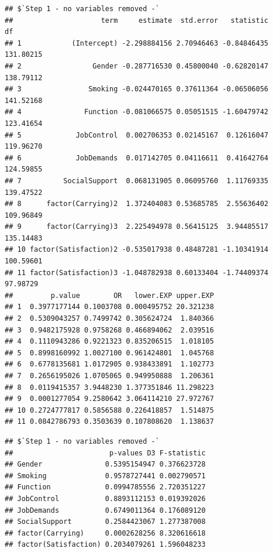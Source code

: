 \documentclass[
]{book}
\newenvironment{Shaded}{\begin{snugshade}}{\end{snugshade}}
\newcommand{\NormalTok}[1]{#1}
\newcommand{\OperatorTok}[1]{\textcolor[rgb]{0.81,0.36,0.00}{\textbf{#1}}}
\begin{document}
\begin{Shaded}
\end{Shaded}

\begin{verbatim}
## $`Step 1 - no variables removed -`
##                     term     estimate  std.error   statistic        df
## 1            (Intercept) -2.298884156 2.70946463 -0.84846435 131.80215
## 2                 Gender -0.287716530 0.45800040 -0.62820147 138.79112
## 3                Smoking -0.024470165 0.37611364 -0.06506056 141.52168
## 4               Function -0.081066575 0.05051515 -1.60479742 123.41654
## 5             JobControl  0.002706353 0.02145167  0.12616047 119.96270
## 6             JobDemands  0.017142705 0.04116611  0.41642764 124.59855
## 7          SocialSupport  0.068131905 0.06095760  1.11769335 139.47522
## 8      factor(Carrying)2  1.372404083 0.53685785  2.55636402 109.96849
## 9      factor(Carrying)3  2.225494978 0.56415125  3.94485517 135.14483
## 10 factor(Satisfaction)2 -0.535017938 0.48487281 -1.10341914 100.59601
## 11 factor(Satisfaction)3 -1.048782938 0.60133404 -1.74409374  97.98729
##         p.value        OR   lower.EXP upper.EXP
## 1  0.3977177144 0.1003708 0.000495752 20.321238
## 2  0.5309043257 0.7499742 0.305624724  1.840366
## 3  0.9482175928 0.9758268 0.466894062  2.039516
## 4  0.1110943286 0.9221323 0.835206515  1.018105
## 5  0.8998160992 1.0027100 0.961424801  1.045768
## 6  0.6778135681 1.0172905 0.938433891  1.102773
## 7  0.2656195026 1.0705065 0.949950888  1.206361
## 8  0.0119415357 3.9448230 1.377351846 11.298223
## 9  0.0001277054 9.2580642 3.064114210 27.972767
## 10 0.2724777817 0.5856588 0.226418857  1.514875
## 11 0.0842786793 0.3503639 0.107808620  1.138637
\end{verbatim}

\begin{Shaded}
\end{Shaded}

\begin{verbatim}
## $`Step 1 - no variables removed -`
##                       p-values D3 F-statistic
## Gender               0.5395154947 0.376623728
## Smoking              0.9578727441 0.002790571
## Function             0.0994785556 2.720351227
## JobControl           0.8893112153 0.019392026
## JobDemands           0.6749011364 0.176089120
## SocialSupport        0.2584423067 1.277387008
## factor(Carrying)     0.0002628256 8.320616618
## factor(Satisfaction) 0.2034079261 1.596048233
\end{verbatim}
\end{document}
